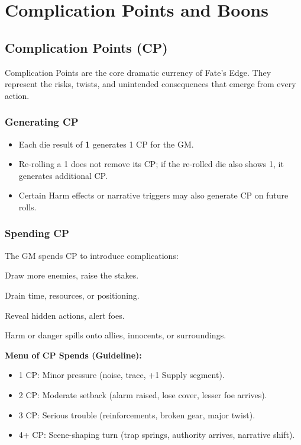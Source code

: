 

\section{Complication Points and Boons}

\subsection{Complication Points (CP)}
Complication Points are the core dramatic currency of Fate’s Edge. They represent the risks, twists, and unintended consequences that emerge from every action.

\subsubsection{Generating CP}
\begin{itemize}
  \item Each die result of \textbf{1} generates 1 CP for the GM.
  \item Re-rolling a 1 does not remove its CP; if the re-rolled die also shows 1, it generates additional CP.
  \item Certain Harm effects or narrative triggers may also generate CP on future rolls.
\end{itemize}

\subsubsection{Spending CP}
The GM spends CP to introduce complications:
\begin{description}[leftmargin=1.5em, style=nextline]
  \item[Escalation:] Draw more enemies, raise the stakes.
  \item[Exhaustion:] Drain time, resources, or positioning.
  \item[Exposure:] Reveal hidden actions, alert foes.
  \item[Collateral:] Harm or danger spills onto allies, innocents, or surroundings.
\end{description}

\textbf{Menu of CP Spends (Guideline):}
\begin{itemize}
  \item 1 CP: Minor pressure (noise, trace, +1 Supply segment).
  \item 2 CP: Moderate setback (alarm raised, lose cover, lesser foe arrives).
  \item 3 CP: Serious trouble (reinforcements, broken gear, major twist).
  \item 4+ CP: Scene-shaping turn (trap springs, authority arrives, narrative shift).
\end{itemize}

